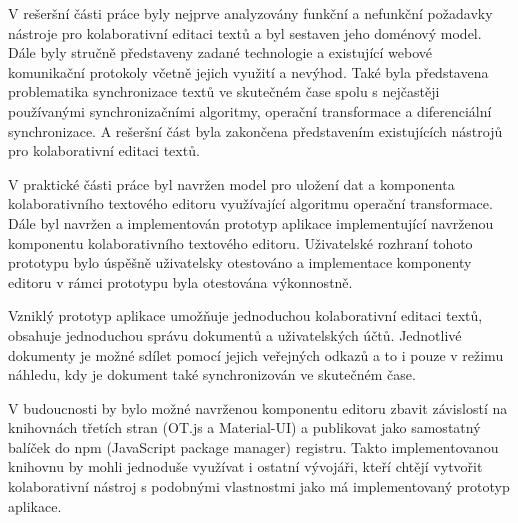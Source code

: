 
\begin{conclusion}

    V rešeršní části práce byly nejprve analyzovány funkční a nefunkční požadavky nástroje pro kolaborativní editaci textů a byl sestaven jeho doménový model.
    Dále byly stručně představeny zadané technologie a existující webové komunikační protokoly včetně jejich využití a nevýhod.
    Také byla představena problematika synchronizace textů ve skutečném čase spolu s nejčastěji používanými synchronizačními algoritmy, operační transformace a diferenciální synchronizace.
    A rešeršní část byla zakončena představením existujících nástrojů pro kolaborativní editaci textů.

    V praktické části práce byl navržen model pro uložení dat a komponenta kolaborativního textového editoru využívající algoritmu operační transformace.
    Dále byl navržen a implementován prototyp aplikace implementující navrženou komponentu kolaborativního textového editoru.
    Uživatelské rozhraní tohoto prototypu bylo úspěšně uživatelsky otestováno a implementace komponenty editoru v rámci prototypu byla otestována výkonnostně.

    Vzniklý prototyp aplikace umožňuje jednoduchou kolaborativní editaci textů, obsahuje jednoduchou správu dokumentů a uživatelských účtů.
    Jednotlivé dokumenty je možné sdílet pomocí jejich veřejných odkazů a to i pouze v režimu náhledu, kdy je dokument také synchronizován ve skutečném čase.

    V budoucnosti by bylo možné navrženou komponentu editoru zbavit závislostí na knihovnách třetích stran (OT.js a Material-UI) a publikovat jako samostatný balíček do npm (JavaScript package manager) registru.
    Takto implementovanou knihovnu by mohli jednoduše využívat i ostatní vývojáři, kteří chtějí vytvořit kolaborativní nástroj s podobnými vlastnostmi jako má implementovaný prototyp aplikace.

\end{conclusion}

